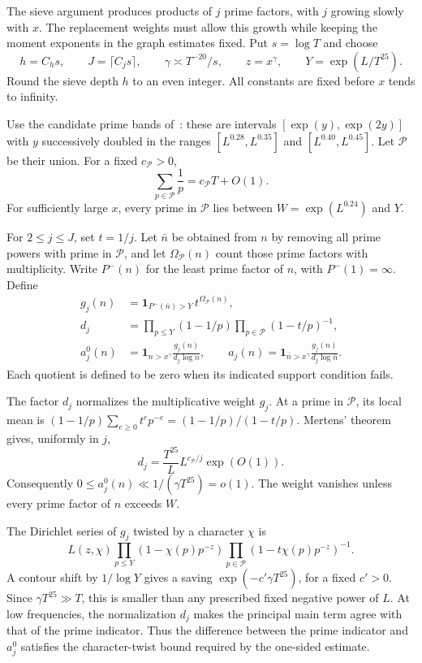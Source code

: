 \documentclass[10pt]{article}
\newcommand{\ind}{\mathbf 1}
\begin{document}
The sieve argument produces products of $j$ prime factors, with $j$ growing slowly with $x$. The replacement weights must allow this growth while keeping the moment exponents in the graph estimates fixed. Put $s=\log T$ and choose
\[
 h=C_hs,\qquad J=\lceil C_js\rceil,\qquad
 \gamma\asymp T^{-20}/s,\qquad z=x^\gamma,\qquad
 Y=\exp(L/T^{25}).
\]
Round the sieve depth $h$ to an even integer. All constants are fixed before $x$ tends to infinity.

Use the candidate prime bands of~\cite[Section~7]{PD}: these are intervals $[\exp(y),\exp(2y)]$ with $y$ successively doubled in the ranges $[L^{0.28},L^{0.35}]$ and $[L^{0.40},L^{0.45}]$. Let $\mathcal P$ be their union. For a fixed $c_{\mathcal P}>0$,
\[
 \sum_{p\in\mathcal P}\frac1p=c_{\mathcal P}T+O(1).
\]
For sufficiently large $x$, every prime in $\mathcal P$ lies between $W=\exp(L^{0.24})$ and $Y$.

For $2\leq j\leq J$, set $t=1/j$. Let $\bar n$ be obtained from $n$ by removing all prime powers with prime in $\mathcal P$, and let $\Omega_{\mathcal P}(n)$ count those prime factors with multiplicity. Write $P^-(n)$ for the least prime factor of $n$, with $P^-(1)=\infty$. Define
\begin{align}
 g_j(n)&=\ind_{P^-(\bar n)>Y}\,t^{\Omega_{\mathcal P}(n)},\nonumber\\
 d_j&=\prod_{p\leq Y}(1-1/p)
       \prod_{p\in\mathcal P}(1-t/p)^{-1},\label{eq:proxy}\\
 a_j^0(n)&=\ind_{n>x^\gamma}\frac{g_j(n)}{d_j\log n},\qquad
 a_j(n)=\ind_{\bar n>x^\gamma}\frac{g_j(n)}{d_j\log\bar n}.
 \nonumber
\end{align}
Each quotient is defined to be zero when its indicated support condition fails.

The factor $d_j$ normalizes the multiplicative weight $g_j$. At a prime in $\mathcal P$, its local mean is $(1-1/p)\sum_{e\geq0}t^ep^{-e}=(1-1/p)/(1-t/p)$. Mertens' theorem gives, uniformly in $j$,
\[
 d_j=\frac{T^{25}}L L^{c_{\mathcal P}/j}\exp(O(1)).
\]
Consequently $0\leq a_j^0(n)\ll1/(\gamma T^{25})=o(1)$. The weight vanishes unless every prime factor of $n$ exceeds $W$.

The Dirichlet series of $g_j$ twisted by a character $\chi$ is
\[
 L(z,\chi)\prod_{p\leq Y}(1-\chi(p)p^{-z})
       \prod_{p\in\mathcal P}(1-t\chi(p)p^{-z})^{-1}.
\]
A contour shift by $1/\log Y$ gives a saving $\exp(-c'\gamma T^{25})$, for a fixed $c'>0$. Since $\gamma T^{25}\gg T$, this is smaller than any prescribed fixed negative power of $L$. At low frequencies, the normalization $d_j$ makes the principal main term agree with that of the prime indicator. Thus the difference between the prime indicator and $a_j^0$ satisfies the character-twist bound required by the one-sided estimate.
\end{document}
